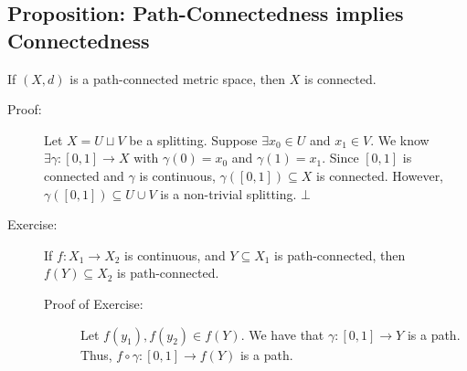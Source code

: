 \documentclass[10pt]{extarticle}
\begin{document}
  \subsection{Proposition: Path-Connectedness implies Connectedness}%
  If $(X,d)$ is a path-connected metric space, then $X$ is connected.
  \begin{description}
    \item[Proof:] Let $X = U\sqcup V$ be a splitting. Suppose $\exists x_0\in U$ and $x_1\in V$. We know $\exists \gamma: [0,1]\rightarrow X$ with $\gamma(0) = x_0$ and $\gamma(1) = x_1$. Since $[0,1]$ is connected and $\gamma$ is continuous, $\gamma([0,1])\subseteq X$ is connected. However, $\gamma([0,1])\subseteq U\cup V$ is a non-trivial splitting. $\bot$
    \item[Exercise:] If $f: X_1\rightarrow X_2$ is continuous, and $Y\subseteq X_1$ is path-connected, then $f(Y)\subseteq X_2$ is path-connected.
      \begin{description}
        \item[Proof of Exercise:] Let $f(y_1),f(y_2)\in f(Y)$. We have that $\gamma: [0,1]\rightarrow Y$ is a path. Thus, $f\circ \gamma: [0,1]\rightarrow f(Y)$ is a path.
      \end{description}
  \end{description}
\end{document}

